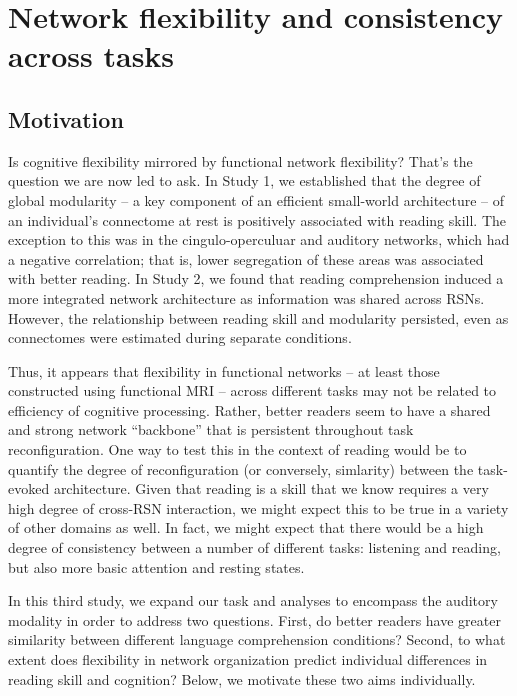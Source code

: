 \chapter{Network flexibility and consistency across tasks}

\section{Motivation}

Is cognitive flexibility mirrored by functional network flexibility? That's the question we are now led to ask. In Study 1, we established that the degree of global modularity -- a key component of an efficient small-world architecture -- of an individual's connectome at rest is positively associated with reading skill. The exception to this was in the cingulo-operculuar and auditory networks, which had a negative correlation; that is, lower segregation of these areas was associated with better reading. In Study 2, we found that reading comprehension induced a more integrated network architecture as information was shared across RSNs. However, the relationship between reading skill and modularity persisted, even as connectomes were estimated during separate conditions. 

Thus, it appears that flexibility in functional networks -- at least those constructed using functional MRI -- across different tasks may not be related to efficiency of cognitive processing. Rather, better readers seem to have a shared and strong network ``backbone'' that is persistent throughout task reconfiguration. One way to test this in the context of reading would be to quantify the degree of reconfiguration (or conversely, simlarity) between the task-evoked architecture. Given that reading is a skill that we know requires a very high degree of cross-RSN interaction, we might expect this to be true in a variety of other domains as well. In fact, we might expect that there would be a high degree of consistency between a number of different tasks: listening and reading, but also more basic attention and resting states. 

In this third study, we expand our task and analyses to encompass the auditory modality in order to address two questions. First, do better readers have greater similarity between different language comprehension conditions? Second, to what extent does flexibility in network organization predict individual differences in reading skill and cognition? Below, we motivate these two aims individually.

